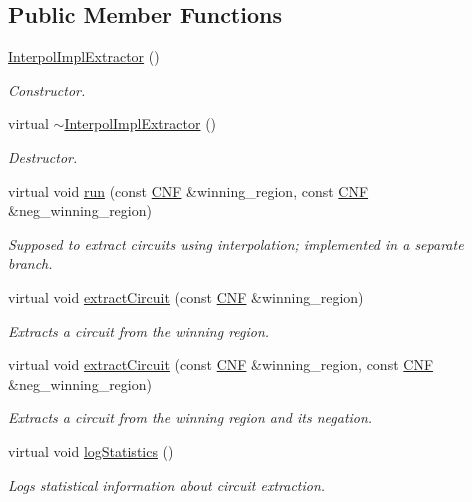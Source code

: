 \subsection*{Public Member Functions}
\begin{DoxyCompactItemize}
\item 
\hyperlink{classInterpolImplExtractor_a953f82557de4a61dad7fd897ad2b508e}{Interpol\-Impl\-Extractor} ()
\begin{DoxyCompactList}\small\item\em Constructor. \end{DoxyCompactList}\item 
virtual \hyperlink{classInterpolImplExtractor_a4cf1cd30d925c5d6511a6e254e3b664f}{$\sim$\-Interpol\-Impl\-Extractor} ()
\begin{DoxyCompactList}\small\item\em Destructor. \end{DoxyCompactList}\item 
virtual void \hyperlink{classInterpolImplExtractor_af4eb9c158e982276edf403d86bc339e2}{run} (const \hyperlink{classCNF}{C\-N\-F} \&winning\-\_\-region, const \hyperlink{classCNF}{C\-N\-F} \&neg\-\_\-winning\-\_\-region)
\begin{DoxyCompactList}\small\item\em Supposed to extract circuits using interpolation; implemented in a separate branch. \end{DoxyCompactList}\item 
virtual void \hyperlink{classCNFImplExtractor_ad329eedd50e443f44edc99db8c2e2613}{extract\-Circuit} (const \hyperlink{classCNF}{C\-N\-F} \&winning\-\_\-region)
\begin{DoxyCompactList}\small\item\em Extracts a circuit from the winning region. \end{DoxyCompactList}\item 
virtual void \hyperlink{classCNFImplExtractor_a5e9694425af3f1a76d8b21ace3c435d9}{extract\-Circuit} (const \hyperlink{classCNF}{C\-N\-F} \&winning\-\_\-region, const \hyperlink{classCNF}{C\-N\-F} \&neg\-\_\-winning\-\_\-region)
\begin{DoxyCompactList}\small\item\em Extracts a circuit from the winning region and its negation. \end{DoxyCompactList}\item 
virtual void \hyperlink{classCNFImplExtractor_aae098749e201b22294a70f6e0a4a58f0}{log\-Statistics} ()
\begin{DoxyCompactList}\small\item\em Logs statistical information about circuit extraction. \end{DoxyCompactList}\end{DoxyCompactItemize}
